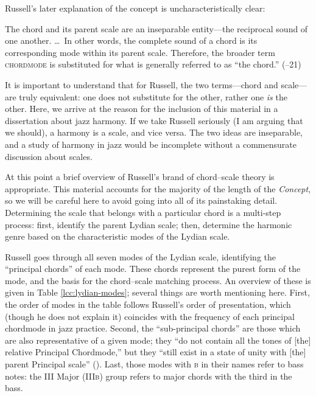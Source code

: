 Russell's later explanation of the concept is uncharacteristically clear:%
%
\begin{quoting}
  \singlespacing
  The chord and its parent scale are an inseparable entity---the reciprocal
  sound of one another. \ldots\ In other words, the complete sound of a chord is
  its corresponding mode within its parent scale. Therefore, the broader term
  \textsc{chordmode} is substituted for what is generally referred to as ``the
  chord.'' (--21)
\end{quoting}
%
\noindent It is important to understand that for Russell, the two
terms---chord and scale---are truly equivalent: one does not substitute for
the other, rather one \emph{is} the other. Here, we arrive at the reason for
the inclusion of this material in a dissertation about jazz harmony. If we
take Russell seriously (I am arguing that we should), a harmony is a scale,
and vice versa. The two ideas are inseparable, and a study of harmony in jazz
would be incomplete without a commensurate discussion about scales.

At this point a brief overview of Russell's brand of chord--scale theory is
appropriate. This material accounts for the majority of the length of the
\emph{Concept}, so we will be careful here to avoid going into all of its
painstaking detail. Determining the scale that belongs with a particular chord
is a multi-step process: first, identify the parent Lydian scale; then,
determine the harmonic genre based on the characteristic modes of the Lydian
scale.

Russell goes through all seven modes of the Lydian scale, identifying the
``principal chords'' of each mode. These chords represent the purest form of
the mode, and the basis for the chord--scale matching process. An overview of
these is given in Table \ref{lcc:lydian-modes}; several things are worth
mentioning here. First, the order of modes in the table follows
Russell's order of presentation, which (though he does not explain it)
coincides with the frequency of each principal chordmode in jazz practice.
Second, the ``sub-principal chords'' are those which are also representative
of a given mode; they ``do not contain all the tones of [the] relative
Principal Chordmode,'' but they ``still exist in a state of unity with [the]
parent Principal scale'' (). Last, those modes with \textsc{b} in their
names refer to bass notes: the III Major (III\textsc{b}) group refers to major
chords with the third in the bass.

